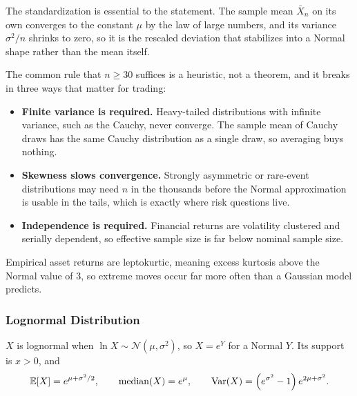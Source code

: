 The standardization is essential to the statement. The sample mean $\bar{X}_n$ on its own converges to the constant $\mu$ by the law of large numbers, and its variance $\sigma^2/n$ shrinks to zero, so it is the rescaled deviation that stabilizes into a Normal shape rather than the mean itself.

\vspace{1ex}

\begin{keybox}
The common rule that $n \geq 30$ suffices is a heuristic, not a theorem, and it breaks in three ways that matter for trading:
\begin{itemize}[itemsep=1ex, label=--]
  \item \textbf{Finite variance is required.} Heavy-tailed distributions with infinite variance, such as the Cauchy, never converge. The sample mean of Cauchy draws has the same Cauchy distribution as a single draw, so averaging buys nothing.
  \item \textbf{Skewness slows convergence.} Strongly asymmetric or rare-event distributions may need $n$ in the thousands before the Normal approximation is usable in the tails, which is exactly where risk questions live.
  \item \textbf{Independence is required.} Financial returns are volatility clustered and serially dependent, so effective sample size is far below nominal sample size.
\end{itemize}

\vspace{1ex}

Empirical asset returns are leptokurtic, meaning excess kurtosis above the Normal value of 3, so extreme moves occur far more often than a Gaussian model predicts.
\end{keybox}

\subsubsection{Lognormal Distribution}

\begin{definition}[Lognormal]
$X$ is lognormal when $\ln X \sim \mathcal{N}(\mu, \sigma^2)$, so $X = e^{Y}$ for a Normal $Y$. Its support is $x > 0$, and
\[
\mathbb{E}[X] = e^{\mu + \sigma^2/2}, \qquad \text{median}(X) = e^{\mu}, \qquad \operatorname{Var}(X) = \left(e^{\sigma^2} - 1\right)e^{2\mu + \sigma^2}.
\]
\end{definition}

